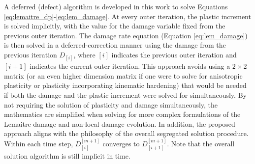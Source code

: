\documentclass[sn-mathphys,Numbered]{sn-jnl}%
\begin{document}
A deferred (defect) algorithm is developed in this work to solve Equations \ref{eq:lemaitre_dp}-\ref{eq:lem_damage}.
At every outer iteration, the plastic increment is solved implicitly, with the value for the damage variable fixed from the previous outer iteration.
The damage rate equation (Equation \ref{eq:lem_damage}) is then solved in a deferred-correction manner using the damage from the previous iteration $D_{[i]}$, where $[i]$ indicates the previous outer iteration and $[i+1]$ indicates the current outer iteration.
This approach avoids using a $2 \times 2$ matrix (or an even higher dimension matrix if one were to solve for anisotropic plasticity or plasticity incorporating kinematic hardening) that would be needed if both the damage and the plastic increment were solved for simultaneously.
By not requiring the solution of plasticity and damage simultaneously, the mathematics are simplified when solving for more complex formulations of the Lemaitre damage and non-local damage evolution.
In addition, the proposed approach aligns with the philosophy of the overall segregated solution procedure.
Within each time step, $D^{[m+1]}_{[i]}$ converges to $D^{[m+1]}_{[i+1]}$.
Note that the overall solution algorithm is still implicit in time.

%


\end{document}
